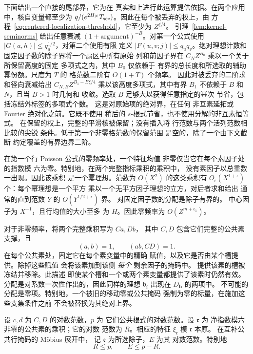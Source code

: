 下面给出一个直接的尾部界，它为在
真实和上进行此运算提供依据。在两个应用中，核自变量都至少为
\(q/(e^{2H_N}T_{\rm sec})\)。因此在每个被丢弃的权上，由
方程~\eqref{eq:centered-localization-threshold}，它至少为 \(Z^{\xi/4}\)。
引理~\ref{lem:kernel-seminorms} 给出任意衰减
\((1+\text{argument})^{-B}\)。对第一个公式使用
\(|G(a,h)|\le q_a^{1/2}\)，对第二个使用有限
定义 \(|F(u,v;j)|\le q_uq_v\)。绝对理想计数和
固定因子数的除子界将一个扇区中所有原始
列和前因子界在 \(C_NZ^{B_0}\) 乘以一个关于所保留高度的固定
多项式之内，其中 \(B_0\) 仅依赖于
有界的总长度和所选取的辅助幂份额。尺度为 \(T\) 的
格范数二阶有 \(O(1+T)\) 个频率。
因此对被丢弃的二阶求和径向衰减给出
\(C_{N,B}Z^{B_1-B\xi/4}\) 乘以该高度多项式，其中有界
\(B_1\) 不依赖于 \(B\) 和 \(N\)，且当 \(B>1\) 时几何和
收敛。选取 \(B\) 足够大以获得任意指定的幂次
节省，包括冻结外标签的多项式个数。
这是对原始项的绝对界，在任何
非互素延拓或 Fourier 绝对化之前。它既不使用
稍后的 \(s\)-根式节省，也不使用分解的非互素恒等式。
在保留的权上，完整的平滑核被保留；没有插入将
行范数与两个活列范数相比较的尖锐
条件。低于第一个非零格范数的保留范围
是空的，除了一个由下文截断
约定覆盖的有界边界二阶。

在第一个行 Poisson 公式的零频率处，一个特征均值
非零仅当它在每个素因子处的指数模
六为零。特别地，在两个完整指标乘积的乘积中，
没有素因子以总重数一出现。因此该乘积
是一个幂理想。范数为 \(O(X^2)\) 的这类乘积有
\(O_\epsilon(X^{1+\epsilon})\) 个：每个幂理想是一个平方
乘以一个无平方因子理想的立方，对后者求和给出
通常的直到范数 \(Y\) 的 \(O(Y^{1/2+\epsilon})\) 界。
对固定因子数的分配是除子有界的。
中心因子为 \(X^{-1}\)，且行均值的大小至多
为 \(H\)。因此零频率为 \(O(Z^{m+\epsilon_1})\)。

对于非零频率，将两个完整乘积写为 \(Ca,Db\)，
其中 \(C,D\) 包含它们完整的公共素支撑，且
\[
 (a,b)=1,\qquad (ab,CD)=1.
\]
在每个公共素处，固定它在每个素变量中的精确
赋值，以及它是否由某个槽提供。除掉这些赋值
会将该素加到该侧 \emph{每个} 剩余因子的掩码中。
提供该素的槽被冻结并移除。此描述
即使某个槽和一个或两个素变量都提供了该素时仍然有效。
分配是对系数一次性作出的，因此同样的理想
\(\mathfrak b_i\) 出现在 \(D_{\mathbf b}\) 的两项中。
不可能的分配是零项。特别地，一个被旧的移动零或公共掩码
强制为零的标量，在施加这些支集条件之前
不会被替换为其绝对上界。

设 \(c,d\) 为 \(C,D\) 的对数范数，\(p\) 为
它们公共根式的对数范数。设 \(\mathfrak r\) 为
净指数模六非零的公共素的乘积；它的对数
范数为 \(R\)。相应的特征
\(\xi_{\mathfrak r}\) 模 \(\mathfrak r\) 本原。
在互补公共行掩码的 M\"obius 展开中，
记 \(\mathfrak e\) 为所选除子，\(E\) 为其
对数范数。特别地
\[
 R\le p,\qquad E\le p-R.
\]

